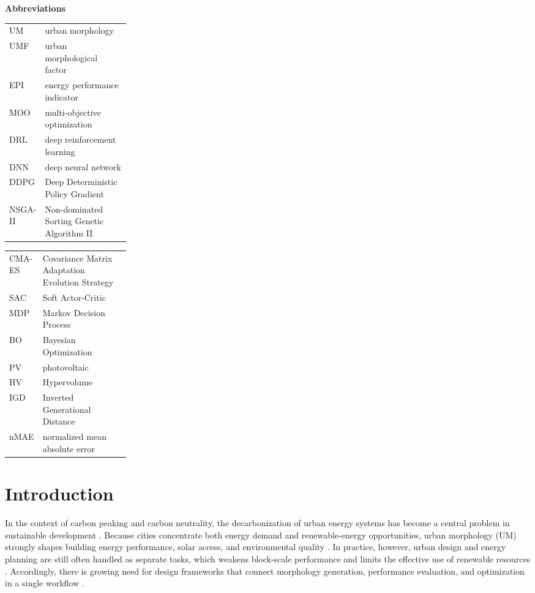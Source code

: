 \documentclass[final,3p,times]{elsarticle}
\begin{document}
\begingroup
\footnotesize
\setlength{\tabcolsep}{3pt}
\renewcommand{\arraystretch}{0.9}
\noindent\textbf{Abbreviations}\par\vspace{2pt}
\begin{minipage}[t]{0.485\linewidth}
\begin{tabularx}{\linewidth}{@{}>{\raggedright\arraybackslash}p{0.23\linewidth}X@{}}
UM & urban morphology \\
UMF & urban morphological factor \\
EPI & energy performance indicator \\
MOO & multi-objective optimization \\
DRL & deep reinforcement learning \\
DNN & deep neural network \\
DDPG & Deep Deterministic Policy Gradient \\
NSGA-II & Non-dominated Sorting Genetic Algorithm II \\
\end{tabularx}
\end{minipage}\hfill
\begin{minipage}[t]{0.485\linewidth}
\begin{tabularx}{\linewidth}{@{}>{\raggedright\arraybackslash}p{0.23\linewidth}X@{}}
CMA-ES & Covariance Matrix Adaptation Evolution Strategy \\
SAC & Soft Actor-Critic \\
MDP & Markov Decision Process \\
BO & Bayesian Optimization \\
PV & photovoltaic \\
HV & Hypervolume \\
IGD & Inverted Generational Distance \\
nMAE & normalized mean absolute error \\
\end{tabularx}
\end{minipage}
\par\vspace{6pt}
\endgroup

\section{Introduction}

In the context of carbon peaking and carbon neutrality, the decarbonization of urban energy systems has become a central problem in sustainable development \cite{ref1,ref2}. Because cities concentrate both energy demand and renewable-energy opportunities, urban morphology (UM) strongly shapes building energy performance, solar access, and environmental quality \cite{ref3,ref4,ref5,ref41,ref42}. In practice, however, urban design and energy planning are still often handled as separate tasks, which weakens block-scale performance and limits the effective use of renewable resources \cite{ref6,ref7}. Accordingly, there is growing need for design frameworks that connect morphology generation, performance evaluation, and optimization in a single workflow \cite{ref8}.
\end{document}
